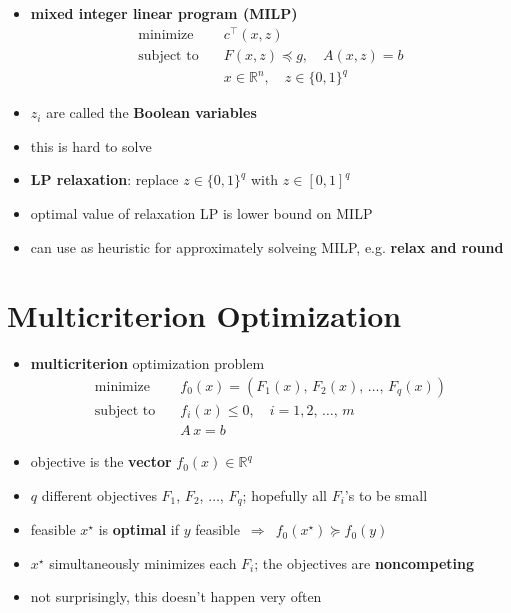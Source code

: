 \documentclass[11pt]{extarticle}
\newcommand{\ds}{\displaystyle}
\newcommand{\ie}{\,\Longrightarrow\,}
\theoremstyle{definition}
\begin{document}
\begin{itemize}
  \item {\bf mixed integer linear program (MILP)}
    \begin{align*}
      \text{minimize}\quad &c^\top(x, z) \\
      \text{subject to}\quad &F(x, z)\preccurlyeq g, \quad A(x, z) = b \\
      \qquad\qquad & x\in\mathbb{R}^n, \quad z\in\{0, 1\}^q
    \end{align*}
  \item $z_i$ are called the {\bf Boolean variables}
  \item this is hard to solve
  \item {\bf LP relaxation}: replace $\ds z\in\{0, 1\}^q$ with $z\in[0, 1]^q$
  \item optimal value of relaxation LP is lower bound on MILP
  \item can use as heuristic for approximately solveing MILP, e.g. {\bf relax and round}
\end{itemize}

\newpage

\section*{Multicriterion Optimization}

\begin{itemize}
  \item {\bf multicriterion} optimization problem
    \begin{align*}
      \text{minimize}\quad &f_0(x) = (F_1(x),\,F_2(x),\,\ldots,\,F_q(x)) \\
      \text{subject to}\quad & f_i(x)\leqslant 0,\quad i = 1, 2,\,\ldots,\,m \\
      \qquad\qquad & A\,x = b 
    \end{align*}
  \item objective is the {\bf vector} $f_0(x)\in\mathbb{R}^q$
  \item $q$ different objectives $F_1$, $F_2$, $\ldots$, $F_q$; hopefully all $F_i$'s to be small
  \item feasible $x^\star$ is {\bf optimal} if $y$ feasible $\ie$ $f_0(x^\star)\succcurlyeq f_0(y)$
  \item $x^\star$ simultaneously minimizes each $F_i$; the objectives are {\bf noncompeting}
  \item not surprisingly, this doesn't happen very often
\end{itemize}
\end{document}
